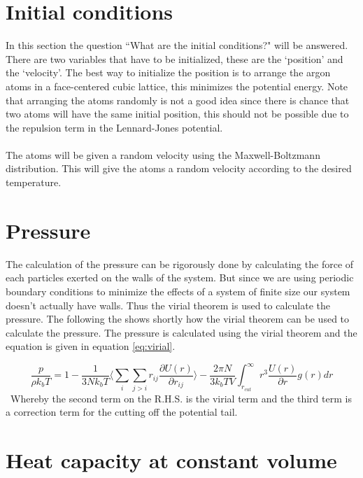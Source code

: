 \documentclass[12pt,a4paper]{report}
\begin{document}
\section{Initial conditions}

In this section the question ``What are the initial conditions?" will be answered.\\
There are two variables that have to be initialized, these are the `position' and the `velocity'. The best way to initialize the position is to arrange the argon atoms in a face-centered cubic lattice, this minimizes the potential energy. Note that arranging the atoms randomly is not a good idea since there is chance that two atoms will have the same initial position, this should not be possible due to the repulsion term in the Lennard-Jones potential.\\ \\ The atoms will be given a random velocity using the Maxwell-Boltzmann distribution. This will give the atoms a random velocity according to the desired temperature.

\section{Pressure}

The calculation of the pressure can be rigorously done by calculating the force of each particles exerted on the walls of the system. But since we are using periodic boundary conditions to minimize the effects of a system of finite size our system doesn't actually have walls. Thus the virial theorem is used to calculate the pressure. The following the shows shortly how the virial theorem can be used to calculate the pressure. The pressure is calculated using the virial theorem and the equation is given in equation \ref{eq:virial}.

\begin{equation}\label{eq:virial}
\frac{p}{\rho k_bT}=1-\frac{1}{3Nk_bT}\Big \langle \sum_i \sum_{j>i}r_{ij}\frac{\partial U(r)}{\partial r_{ij}}\Big \rangle -\frac{2\pi N}{3k_b T V}\int_{r_{cut}}^\infty r^3 \frac{U(r)}{\partial r}g(r)dr
\end{equation}
\
Whereby the second term on the R.H.S. is the virial term and the third term is a correction term for the cutting off the potential tail.

\section{Heat capacity at constant volume}
\end{document}
